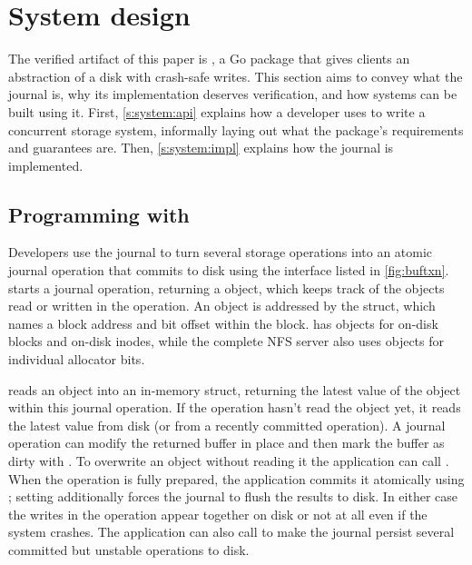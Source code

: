 \section{System design}
\label{s:system}

The verified artifact of this paper is \txn, a Go package that gives clients an
abstraction of a disk with crash-safe writes. This section aims to convey what
the journal is, why its implementation deserves verification, and how systems can be built
using it. First, \autoref{s:system:api} explains how a developer uses
\txn to write a concurrent storage system, informally laying out what the
package's requirements and guarantees are. Then,
\autoref{s:system:impl} explains how the journal is implemented.



\subsection{Programming with \txn}
\label{s:system:api}

Developers use the journal to turn several storage operations into an atomic journal operation that commits to disk using the \txn
interface listed in \autoref{fig:buftxn}.   starts a
journal operation, returning a  object, which keeps track of the
objects read or written in the operation.  An object is addressed by the
 struct, which names a block address and bit offset within the block. \simplenfs
has objects for on-disk blocks and on-disk inodes, while the
complete NFS server also uses objects for individual allocator bits.

 reads an object into an in-memory  struct, returning the latest value of the
object within this journal operation.  If the operation hasn't read the
object yet, it reads the latest value from disk (or from a recently
committed operation).  A journal operation can modify the returned buffer in place and
then mark the buffer as dirty with . To overwrite an object without
reading it the application can call . When the operation is
fully prepared, the application commits it atomically using ; setting
 additionally forces the journal to flush the results to disk.
In either case the writes in the operation appear together on disk or not at
all even if the system crashes. The application can also call  to
make the journal persist several committed but unstable operations to disk.

